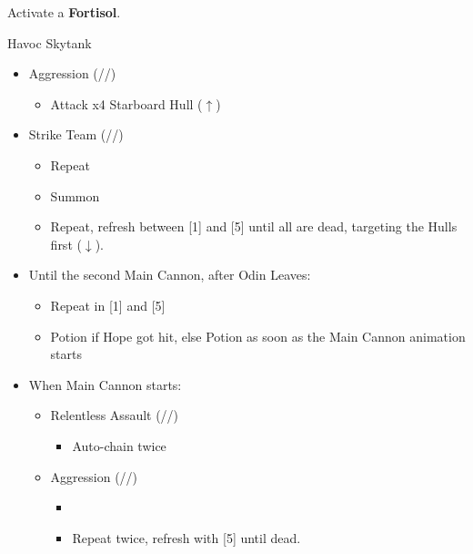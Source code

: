 	\renewcommand{\first}{[1] Aggression (\com/\com/\rav)}
	\renewcommand{\second}{[2] Relentless Assault (\rav/\com/\rav)}
	\renewcommand{\third}{[3] Aggression (\com/\com/\rav)}
	\renewcommand{\fourth}{[4] Tireless Charge (\com/\com/\med)}
	\renewcommand{\fifth}{[5] Strike Team (\com/\com/\syn)}
	\renewcommand{\sixth}{[6] Tireless Charge (\com/\com/\med)}

	Activate a \textbf{Fortisol}.

	\begin{battle}[1:36]{Havoc Skytank}
		\begin{itemize}
			\item \first
			      \begin{itemize}
				      \item Attack x4 Starboard Hull ($\uparrow$)
			      \end{itemize}
			\item \fifth
			      \begin{itemize}
				      \item Repeat
				      \item Summon
				      \item Repeat, refresh between [1] and [5]  until all are dead, targeting the Hulls first ($\downarrow$).
			      \end{itemize}
			\item Until the second Main Cannon, after Odin Leaves:
			      \begin{itemize}
				      \item Repeat in [1] and [5]
                                                 \item Potion if Hope got hit, else Potion as soon as the Main Cannon animation starts
			      \end{itemize}
			\item When Main Cannon starts:
			      \begin{itemize}
				      \item \begin{flushleft} \second \end{flushleft}
				            \begin{itemize}
					            \item Auto-chain twice
				            \end{itemize}
				      \item \first
				            \begin{itemize}
					            \item \stagger
					            \item Repeat twice, refresh with [5] until dead.
				            \end{itemize}
			      \end{itemize}
		\end{itemize}
	\end{battle}
